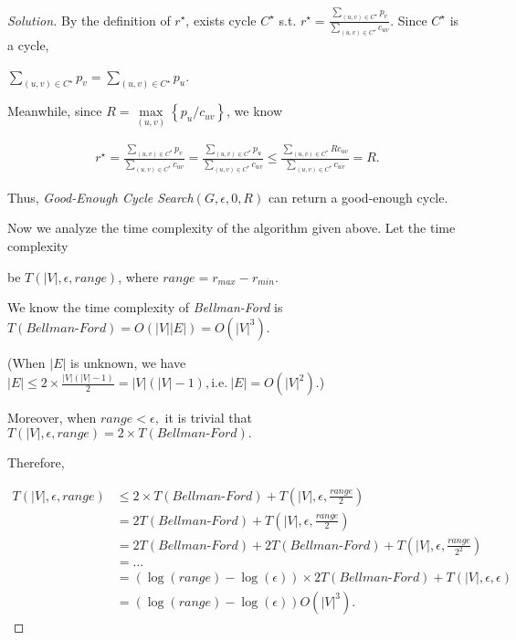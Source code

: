 \documentclass{article}
\newenvironment{solution}{\begin{proof}[\noindent\it Solution]}{\end{proof}}
\begin{document}
\begin{solution}
    \hspace{2.6em}
    By the definition of $r^{\star}$, exists cycle $C^{\star}$ s.t. $r^{\star} = \frac{\sum_{(u,v)\in C^{\star}}p_v}{\sum_{(u,v)\in C^{\star}}c_{uv}}$. Since $C^{\star}$ is a cycle, 
    
    $\sum_{(u,v)\in C^{\star}}p_v=\sum_{(u,v)\in C^{\star}}p_u$. 
    
    \hspace{2.6em}
    Meanwhile, since $R=\underset{(u,v)}{\max}\left\{p_u/c_{uv}\right\}$, we know
    
    \vspace{-2em}
    \begin{align*}
        r^{\star} = \frac{\sum_{(u,v)\in C^{\star}}p_v}{\sum_{(u,v)\in C^{\star}}c_{uv}} = \frac{\sum_{(u,v)\in C^{\star}}p_u}{\sum_{(u,v)\in C^{\star}}c_{uv}} \le \frac{\sum_{(u,v)\in C^{\star}} Rc_{uv}}{\sum_{(u,v)\in C^{\star}}c_{uv}} = R.
    \end{align*}
    
    \vspace{-0.5em} \hspace{2.6em}
    Thus, \textit{Good-Enough Cycle Search}$(G,\epsilon,0,R)$ can return a good-enough cycle.
    
    \vspace{2em} \hspace{2.6em}
    Now we analyze the time complexity of the algorithm given above. Let the time complexity
    
    be $T(|V|,\epsilon,range)$, where $range=r_{max}-r_{min}$.
    
    \hspace{2.6em}
    We know the time complexity of \textit{Bellman-Ford} is $T(Bellman\text{-}Ford) = O(|V||E|)=O(|V|^3).$ 
    
    (When $|E|$ is unknown, we have $|E|\le 2\times\frac{|V|\left(\left|V\right|-1\right)}{2}=|V|(|V|-1),\mathrm{i.e.}\ |E|=O\left(|V|^2\right).$) 
    
    \hspace{2.6em}
    Moreover, when $range<\epsilon,$ it is trivial that $T\left(|V|,\epsilon,range\right)=2\times T(Bellman\text{-}Ford).$
    
    \hspace{2.6em}
    Therefore,
    
    \vspace{-2em}
    \begin{align*}
        T(|V|,\epsilon,range) &\le 2\times T(Bellman\text{-}Ford) + T\left(|V|,\epsilon,\frac{range}{2}\right) \\
        &= 2T(Bellman\text{-}Ford) + T\left(|V|,\epsilon,\frac{range}{2}\right) \\
        &= 2T(Bellman\text{-}Ford) + 2T(Bellman\text{-}Ford) +  T\left(|V|,\epsilon,\frac{range}{2^2}\right) \\
        &= \dots \\
        &= \left(\log(range)-\log(\epsilon)\right)\times 2T(Bellman\text{-}Ford) + T\left(|V|,\epsilon,\epsilon\right)\\
        &= \left(\log(range)-\log(\epsilon)\right)O(|V|^3).
    \end{align*}
    

\end{solution}
\end{document}

